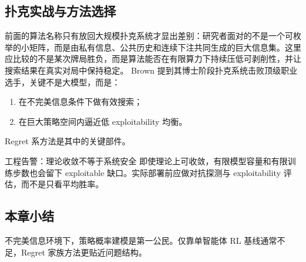 \subsection{扑克实战与方法选择}
前面的算法名称只有放回大规模扑克系统才显出差别：研究者面对的不是一个可枚举的小矩阵，而是由私有信息、公共历史和连续下注共同生成的巨大信息集。这里应比较的不是某次牌局胜负，而是算法能否在有限算力下持续压低可剥削性，并让搜索结果在真实对局中保持稳定。
Brown 提到其博士阶段扑克系统击败顶级职业选手，关键不是大模型，而是：
\begin{enumerate}
    \item 在不完美信息条件下做有效搜索；
    \item 在巨大策略空间内逼近低 exploitability 均衡。
\end{enumerate}
Regret 系方法是其中的关键部件。

\begin{warningbox}{工程告警：理论收敛不等于系统安全}
即使理论上可收敛，有限模型容量和有限训练步数也会留下 exploitable 缺口。实际部署前应做对抗探测与 exploitability 评估，而不是只看平均胜率。
\end{warningbox}

\subsection{本章小结}
不完美信息环境下，策略概率建模是第一公民。仅靠单智能体 RL 基线通常不足，Regret 家族方法更贴近问题结构。

